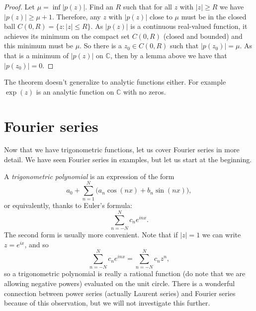 \documentclass[12pt]{book}
\newcommand{\abs}[1]{\left\lvert {#1} \right\rvert}
\newcommand{\C}{{\mathbb{C}}}
\newcommand{\sectionnewpage}{\clearpage}
\theoremstyle{plain}
\theoremstyle{remark}
\theoremstyle{definition}
\theoremstyle{exercise}
\theoremstyle{example}
\begin{document}

\begin{proof}
Let $\mu = \inf \abs{p(z)}$.  Find an $R$ such that
for all $z$ with $\abs{z} \geq R$ we have $\abs{p(z)} \geq \mu+1$.
Therefore, any $z$ with $\abs{p(z)}$ close to $\mu$ must be in the
closed ball $C(0,R) = \{ z : \abs{z} \leq R \}$.  As $\abs{p(z)}$
is a continuous real-valued function, it achieves its minimum
on the compact set $C(0,R)$ (closed and bounded) and this minimum must
be $\mu$.  So there is a $z_0 \in C(0,R)$ such that $\abs{p(z_0)} = \mu$.
As that is a minimum of $\abs{p(z)}$ on $\C$, then by a lemma above we have that $\abs{p(z_0)} = 0$.
\end{proof}


The theorem doesn't generalize to analytic functions either.  For example
$\exp(z)$ is an analytic function on $\C$ with no zeros.


\sectionnewpage
\section{Fourier series}
\label{sec:FIXME}

Now that we have trigonometric functions, let us cover Fourier series
in more detail.  We have seen Fourier series in examples, but let us start
at the beginning. 

\medskip

A \emph{trigonometric polynomial} is an expression of the form
$$
a_0 + \sum_{n=1}^N \bigl(a_n \cos(nx) + b_n \sin(nx) \bigr),
$$
or equivalently, thanks to Euler's formula:
$$
\sum_{n=-N}^N c_n e^{inx} .
$$
The second form is usually more convenient.  Note that if
$\abs{z}=1$ we can write $z = e^{ix}$, and so
$$
\sum_{n=-N}^N c_n e^{inx} = 
\sum_{n=-N}^N c_n z^n ,
$$
so a trigonometric polynomial is really a rational function (do note that
we are allowing negative powers) evaluated on the unit circle.  There is
a wonderful connection between power series (actually Laurent series) and
Fourier series because of this observation, but we will not investigate this further.
\end{document}
